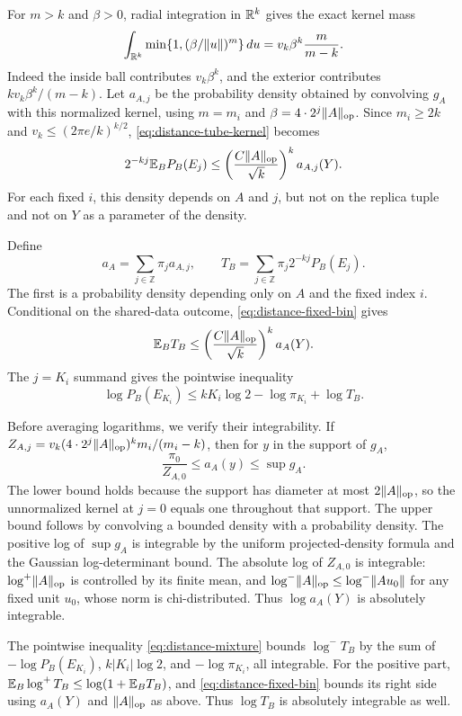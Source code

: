 For $m>k$ and $\beta>0$, radial integration in $\mathbb R^k$ gives the exact
kernel mass
\begin{equation}\label{eq:distance-kernel-mass}
 \int_{\mathbb R^k}\min\{1,(\beta/\lVert u\rVert)^m\}\,du
 =v_k\beta^k\frac{m}{m-k}.
\end{equation}
Indeed the inside ball contributes $v_k\beta^k$, and the exterior contributes
$kv_k\beta^k/(m-k)$. Let $a_{A,j}$ be the probability density obtained
by convolving $g_A$ with this normalized kernel, using
$m=m_i$ and $\beta=4\cdot2^j\lVert A\rVert_{\mathrm{op}}$. Since $m_i\ge2k$ and
$v_k\le(2\pi e/k)^{k/2}$, \eqref{eq:distance-tube-kernel} becomes
\begin{equation}\label{eq:distance-fixed-bin}
 2^{-kj}\mathbb E_B P_B(E_j)
 \le\left(\frac{C\lVert A\rVert_{\mathrm{op}}}{\sqrt k}\right)^k a_{A,j}(Y).
\end{equation}
For each fixed $i$, this density depends on $A$ and $j$, but not on the
replica tuple and not on $Y$ as a parameter of the density.

Define
\[
 a_A=\sum_{j\in\mathbb Z}\pi_j a_{A,j},\qquad
 T_B=\sum_{j\in\mathbb Z}\pi_j2^{-kj}P_B(E_j).
\]
The first is a probability density depending only on $A$ and the fixed
index $i$. Conditional on the shared-data outcome,
\eqref{eq:distance-fixed-bin} gives
\[
 \mathbb E_B T_B\le
 \left(\frac{C\lVert A\rVert_{\mathrm{op}}}{\sqrt k}\right)^k a_A(Y).
\]
The $j=K_i$ summand gives the pointwise inequality
\begin{equation}\label{eq:distance-mixture}
 \log P_B(E_{K_i})
 \le kK_i\log2-\log\pi_{K_i}
   +\log T_B.
\end{equation}

Before averaging logarithms, we verify their integrability. If
$Z_{A,j}=v_k(4\cdot2^j\lVert A\rVert_{\mathrm{op}})^k m_i/(m_i-k)$, then for $y$ in
the support of $g_A$,
\[
 \frac{\pi_0}{Z_{A,0}}\le a_A(y)\le\sup g_A.
\]
The lower bound holds because the support has diameter at most
$2\lVert A\rVert_{\mathrm{op}}$, so the unnormalized kernel at $j=0$ equals one throughout
that support. The upper bound follows by convolving a bounded density with
a probability density. The positive log of $\sup g_A$ is integrable by the
uniform projected-density formula and the Gaussian log-determinant bound.
The absolute log of $Z_{A,0}$ is integrable: $\log^+\lVert A\rVert_{\mathrm{op}}$ is
controlled by its finite mean, and
$\log^-\lVert A\rVert_{\mathrm{op}}\le\log^-\lVert Au_0\rVert$ for any fixed unit $u_0$, whose
norm is chi-distributed. Thus $\log a_A(Y)$ is absolutely integrable.

The pointwise inequality
\eqref{eq:distance-mixture} bounds $\log^-T_B$ by the sum of
$-\log P_B(E_{K_i})$, $k|K_i|\log2$, and $-\log\pi_{K_i}$, all integrable.
For the positive part,
$\mathbb E_B\log^+T_B\le\log(1+\mathbb E_BT_B)$, and
\eqref{eq:distance-fixed-bin} bounds its right side using $a_A(Y)$ and
$\lVert A\rVert_{\mathrm{op}}$ as above. Thus $\log T_B$ is absolutely integrable as well.

